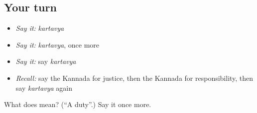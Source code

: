 \subsection*{Your turn}
\begin{itemize}
\raggedright
  \item \emph{Say it:} \emph{kartavya}
  \item \emph{Say it:} \emph{kartavya}, once more
  \item \emph{Say it:} say \emph{kartavya}
  \item \emph{Recall:} say the Kannada for justice, then the Kannada for responsibility, then say \emph{kartavya} again
\end{itemize}

\begin{tcolorbox}[breakable,colback=teal!4,colframe=teal!35!black,title={Before you move on}]
What does  mean? (\textquotedblleft{}A duty\textquotedblright{}.) Say it once more.
\end{tcolorbox}
